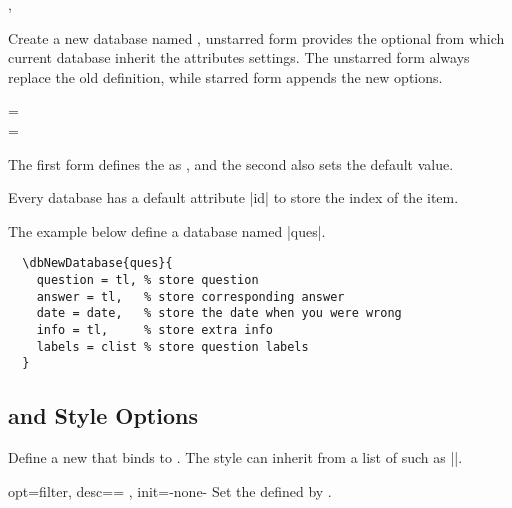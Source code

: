 \documentclass[full]{l3doc}
\begin{document}
\begin{documentation}
\begin{function}{\dbNewDatabase, \dbNewDatabase*}
\end{function}

Create a new database named , unstarred form provides the optional
 from which current database inherit the attributes settings.
The unstarred form always replace the old definition, while starred form
appends the new options.

\begin{Syntax}
   =  \\
   = \textbar{}
\end{Syntax}

The first form defines the  as , and the second also
sets the default value.

\begin{note}
  Every database has a default attribute |id| to store the index of the item.
\end{note}

The example below define a database named |ques|.
\begin{verbatim}
  \dbNewDatabase{ques}{
    question = tl, % store question
    answer = tl,   % store corresponding answer
    date = date,   % store the date when you were wrong
    info = tl,     % store extra info
    labels = clist % store question labels
  }
\end{verbatim}

\subsection{ and Style Options}

\begin{function}{\dbNewStyle}
  \begin{syntax}
        
  \end{syntax}

Define a new  that binds to . The style can inherit
from a list of  such as
||.
\end{function}

\bigskip

\begin{option}{opt=filter, desc={= }, init=-none-}
  Set the  defined by .
\end{option}


\end{documentation}
\end{document}
